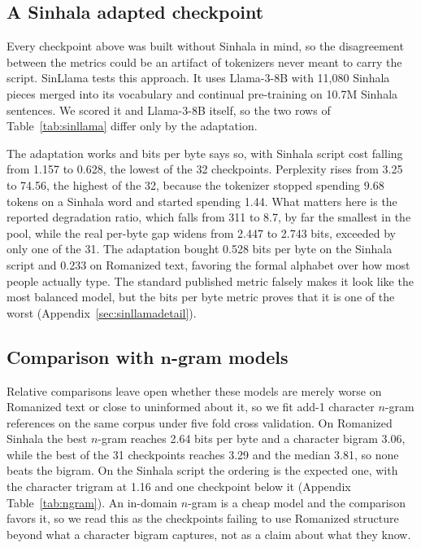 \documentclass[11pt]{article}
\begin{document}
\subsection{A Sinhala adapted checkpoint}
\label{sec:sinllama}

Every checkpoint above was built without Sinhala in mind, so the disagreement between the
metrics could be an artifact of tokenizers never meant to carry the script. SinLlama \citep{aravinda2025sinllama} tests this approach. It uses Llama-3-8B with 11{,}080 Sinhala pieces merged
into its vocabulary and continual pre-training on 10.7M Sinhala sentences. We scored it and
Llama-3-8B itself, so the two rows of Table~\ref{tab:sinllama} differ only by the
adaptation.

The adaptation works and bits per byte says so, with Sinhala script cost falling from
1.157 to 0.628, the lowest of the 32 checkpoints. Perplexity rises from 3.25 to 74.56,
the highest of the 32, because the tokenizer stopped spending 9.68 tokens on a Sinhala
word and started spending 1.44. What matters here is the reported degradation ratio,
which falls from 311 to 8.7, by far the smallest in the pool, while the real per-byte gap
widens from 2.447 to 2.743 bits, exceeded by only one of the 31. The adaptation bought
0.528 bits per byte on the Sinhala script and 0.233 on Romanized text, favoring the formal alphabet over how most people actually type. The standard published metric falsely makes it look like the most balanced model, but the bits per byte metric proves that it is one of the worst (Appendix~\ref{sec:sinllamadetail}).

\subsection{Comparison with $\mathbf{n}$-gram models}

Relative comparisons leave open whether these models are merely worse on Romanized text
or close to uninformed about it, so we fit add-1 character $n$-gram references on the
same corpus under five fold cross validation. On Romanized Sinhala the best $n$-gram
reaches 2.64 bits per byte and a character bigram 3.06, while the best of the 31
checkpoints reaches 3.29 and the median 3.81, so none beats the bigram. On the Sinhala
script the ordering is the expected one, with the character trigram at 1.16 and one
checkpoint below it (Appendix Table~\ref{tab:ngram}). An in-domain $n$-gram is a cheap
model and the comparison favors it, so we read this as the checkpoints failing to use
Romanized structure beyond what a character bigram captures, not as a claim about what
they know.
\end{document}
